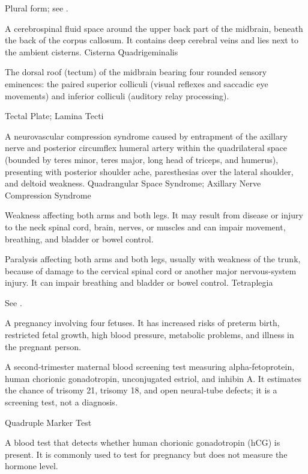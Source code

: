  Plural form; see .

 A cerebrospinal fluid space around the upper back part of the midbrain, beneath the back of the corpus callosum. It contains deep cerebral veins and lies next to the ambient cisterns.
\synonyms
Cisterna Quadrigeminalis

 The dorsal roof (tectum) of the midbrain bearing four rounded sensory eminences: the paired superior colliculi (visual reflexes and saccadic eye movements) and inferior colliculi (auditory relay processing).

\synonyms
Tectal Plate; Lamina Tecti

 A neurovascular compression syndrome caused by entrapment of the axillary nerve and posterior circumflex humeral artery within the quadrilateral space (bounded by teres minor, teres major, long head of triceps, and humerus), presenting with posterior shoulder ache, paresthesias over the lateral shoulder, and deltoid weakness.
\synonyms
Quadrangular Space Syndrome; Axillary Nerve Compression Syndrome

 Weakness affecting both arms and both legs. It may result from disease or injury to the neck spinal cord, brain, nerves, or muscles and can impair movement, breathing, and bladder or bowel control.

 Paralysis affecting both arms and both legs, usually with weakness of the trunk, because of damage to the cervical spinal cord or another major nervous-system injury. It can impair breathing and bladder or bowel control.
\synonyms
Tetraplegia

 See .

 A pregnancy involving four fetuses. It has increased risks of preterm birth, restricted fetal growth, high blood pressure, metabolic problems, and illness in the pregnant person.

 A second-trimester maternal blood screening test measuring alpha-fetoprotein, human chorionic gonadotropin, unconjugated estriol, and inhibin A. It estimates the chance of trisomy 21, trisomy 18, and open neural-tube defects; it is a screening test, not a diagnosis.

\synonyms
Quadruple Marker Test

 A blood test that detects whether human chorionic gonadotropin (hCG) is present. It is commonly used to test for pregnancy but does not measure the hormone level.

